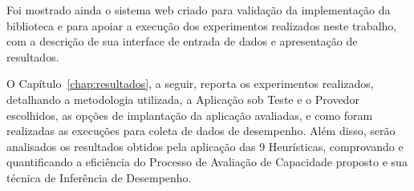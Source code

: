 Foi mostrado ainda o sistema web criado para validação da implementação da biblioteca e para 
apoiar a execução dos experimentos realizados neste trabalho, com a descrição de sua interface de
entrada de dados e apresentação de resultados.

O Capítulo~\ref{chap:resultados}, a seguir, reporta os experimentos 
realizados, detalhando a metodologia utilizada, a Aplicação sob Teste e o Provedor escolhidos, as opções de implantação da aplicação avaliadas, e como foram realizadas as execuções para coleta de dados de desempenho. 
Além disso, serão analisados os resultados obtidos pela aplicação das 9 Heurísticas, 
comprovando e quantificando a eficiência do Processo de Avaliação de Capacidade proposto
e sua técnica de Inferência de Desempenho.
 
